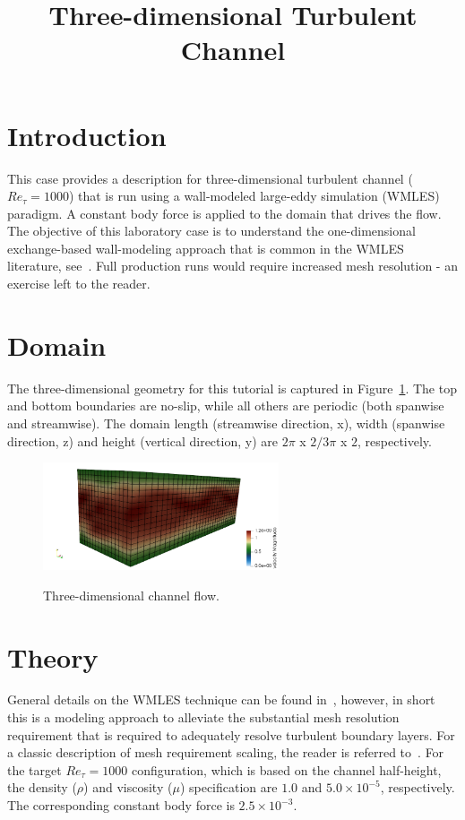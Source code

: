\documentclass{article}
\title{Three-dimensional Turbulent Channel}
\date{}
\begin{document}
\maketitle

\section{Introduction}
This case provides a description for three-dimensional turbulent channel 
($Re_\tau = 1000$) that is run using a wall-modeled large-eddy simulation (WMLES) paradigm.
A constant body force is applied to the domain that drives the flow. The objective 
of this laboratory case is to understand the one-dimensional exchange-based
wall-modeling approach that is common in the WMLES literature, see~\cite{larsson2016}.
Full production runs would require increased mesh resolution - an exercise left to the
reader.

\section{Domain}
The three-dimensional geometry for this tutorial is captured in Figure~\ref{fig:geom}. 
The top and bottom boundaries are no-slip, while all others are periodic (both spanwise
and streamwise). The domain length (streamwise direction, x), width (spanwise direction, z) and
height (vertical direction, y) are $2\pi$ \!x $2/3\pi$ \!x $2$, respectively.

\begin{figure}[!htbp]
  \centering
  {
   \includegraphics[height=1.25in]{images/3d_hex8_turb_channel_geom.png}
  }
  \caption{Three-dimensional channel flow.}
  \label{fig:geom}
\end{figure}

\section{Theory}
General details on the WMLES technique can be found in~\cite{larsson2016}, however, in short
this is a modeling approach to alleviate the substantial mesh resolution requirement that is
required to adequately resolve turbulent boundary layers. For a classic description of 
mesh requirement scaling, the reader is referred to~\cite{chapman}. For the 
target $Re_\tau = 1000$ configuration, which is based on the channel half-height, the density ($\rho$) 
and viscosity ($\mu$) specification are $1.0$ and $5.0 \times 10^{-5}$, respectively. The corresponding
constant body force is $2.5 \times 10^{-3}$. 
\end{document}
